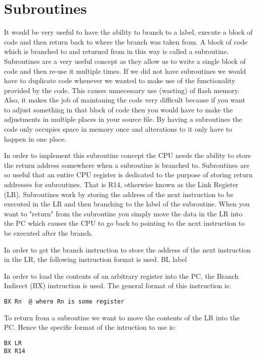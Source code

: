 \chapter{Subroutines}
It would be very useful to have the ability to branch to a label, execute a block of code and then return back to where the branch was taken from. A block of code which is branched to and returned from in this way is called a subroutine.
Subroutines are a very useful concept as they allow us to write a single block of code and then re-use it multiple times. 
If we did not have subroutines we would have to duplicate code whenever we wanted to make use of the functionality provided by the code.
This causes unnecessary use (wasting) of flash memory.
Also, it makes the job of maintaning the code very difficult because if you want to adjust something in that block of code then you would have to make the adjustments in multiple places in your source file.
By having a subroutines the code only occupies space in memory once and alterations to it only have to happen in one place.

In order to implement this subroutine concept the CPU needs the ability to store the return address somewhere when a subroutine is branched to. 
Subroutines are so useful that an entire CPU register is dedicated to the purpose of storing return addresses for subroutines. That is R14, otherwise known as the Link Register (LR).
Subroutines work by storing the address of the next instruction to be executed in the LR and then branching to the label of the subroutine.
When you want to "return" from the subroutine you simply move the data in the LR into the PC which causes the CPU to go back to pointing to the next instruction to be executed after the branch.

In order to get the branch instruction to store the address of the next instruction in the LR, the following instruction format is used.
BL label

In order to load the contents of an arbitrary register into the PC, the Branch Indirect (BX) instruction is used.
The general format of this instruction is:
\begin{lstlisting}[fontadjust=true,frame=trBL]
BX Rn  @ where Rn is some register
\end{lstlisting}

To return from a subroutine we want to move the contents of the LR into the PC. Hence the specific format of the intruction to use is:
\begin{lstlisting}[fontadjust=true,frame=trBL]
BX LR
BX R14
\end{lstlisting}
